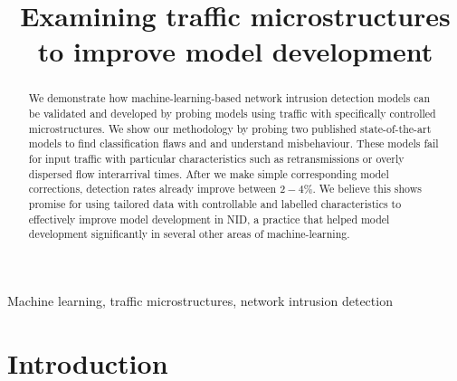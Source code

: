 \documentclass[10pt,conference]{IEEEtran}
\begin{document}
 

\title{Examining traffic microstructures to improve model development}

\author{
\and
{}
}

\maketitle

\begin{abstract}

We demonstrate how machine-learning-based network intrusion detection models can be validated and developed by probing models using traffic with specifically controlled microstructures. We show our methodology by probing two published state-of-the-art models to find classification flaws and and understand misbehaviour. These models fail for input traffic with particular characteristics such as retransmissions or overly dispersed flow interarrival times. After we make simple corresponding model corrections, detection rates already improve between $2-4\%$.
We believe this shows promise for using tailored data with controllable and labelled characteristics to effectively improve model development in NID, a practice that helped model development significantly in several other areas of machine-learning.

\end{abstract}


\begin{IEEEkeywords}
Machine learning, traffic microstructures, network intrusion detection
\end{IEEEkeywords} 	



\section{Introduction}
\end{document}
